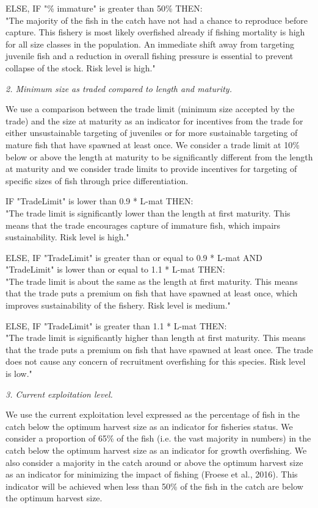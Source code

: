 ELSE, IF "\% immature" is greater than 50\% THEN:\\[0cm]
"The majority of the fish in the catch have not had a chance to reproduce before capture. This fishery is most likely overfished already if fishing mortality is high for all size classes in the population. An immediate shift away from targeting juvenile fish and a reduction in overall fishing pressure is essential to prevent collapse of the stock. Risk level is high."

\textit{2. Minimum size as traded compared to length and maturity.}

We use a comparison between the trade limit (minimum size accepted by the trade) and the size at maturity as an indicator for incentives from the trade for either unsustainable targeting of juveniles or for more sustainable targeting of mature fish that have spawned at least once. We consider a trade limit at 10\% below or above the length at maturity to be significantly different from the length at maturity and we consider trade limits to provide incentives for targeting of specific sizes of fish through price differentiation.

IF "TradeLimit" is lower than 0.9 * L-mat THEN:\\[0cm]
"The trade limit is significantly lower than the length at first maturity.  This means that the trade encourages capture of immature fish, which impairs sustainability. Risk level is high."

ELSE, IF "TradeLimit" is greater than or equal to 0.9 * L-mat AND "TradeLimit" is lower than or equal to 1.1 * L-mat THEN:\\[0cm]
"The trade limit is about the same as the length at first maturity.  This means that the trade puts a premium on fish that have spawned at least once, which improves sustainability of the fishery. Risk level is medium."

ELSE, IF "TradeLimit" is greater than 1.1 * L-mat THEN:\\[0cm]
"The trade limit is significantly higher than length at first maturity.  This means that the trade puts a premium on fish that have spawned at least once. The trade does not cause any concern of recruitment overfishing for this species. Risk level is low."

\textit{3. Current exploitation level.}

We use the current exploitation level expressed as the percentage of fish in the catch below the optimum harvest size as an indicator for fisheries status. We consider a proportion of 65\% of the fish (i.e. the vast majority in numbers) in the catch below the optimum harvest size as an indicator for growth overfishing. We also consider a majority in the catch around or above the optimum harvest size as an indicator for minimizing the impact of fishing (Froese et al., 2016). This indicator will be achieved when less than 50\% of the fish in the catch are below the optimum harvest size.

